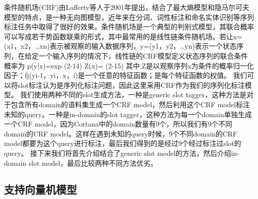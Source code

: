 \documentclass[master]{njuthesis}
\begin{document}
条件随机场(CRF)由Lafferty等人于2001年提出，结合了最大熵模型和隐马尔可夫模型的特点，是一种无向图模型，近年来在分词、词性标注和命名实体识别等序列标注任务中取得了很好的效果。条件随机场是一个典型的判别式模型，其联合概率可以写成若干势函数联乘的形式，其中最常用的是线性链条件随机场。若让x=(x1，x2，…xn)表示被观察的输入数据序列，y=(y1，y2，…yn)表示一个状态序列，在给定一个输入序列的情况下，线性链的CRF模型定义状态序列的联合条件概率为
p(y|x)=exp{} (2-14)
Z(x)={} (2-15)
其中:Z是以观察序列x为条件的概率归一化因子；fj(yi-1，yi，x，i)是一个任意的特征函数；是每个特征函数的权值。
我们可以将slot标注认为是序列化标注问题，因此这里采用CRF作为我们的序列化标注模型。
我们使用两种不同的slot生成方法，一种是generic slot tagger，这种方法是对于包含所有domain的语料集生成一个CRF model，然后利用这个CRF model标注未知的query。一种是in-domain的slot tagger，这种方法为每一个domain单独生成一个CRF model，因为Cortana中的domain数量有9个，所以我们有9个不同domain的CRF model。这样在遇到未知的query时候，9个不同domain的CRF model都要为这个query进行标注，最后我们得到的是经过9个经过标注过slot的query。
接下来我们将首先介绍结合了generic slot model的方法，然后介绍in-domain slot model，最后比较两种不同方法优劣。
\subsection{支持向量机模型}
\end{document}
